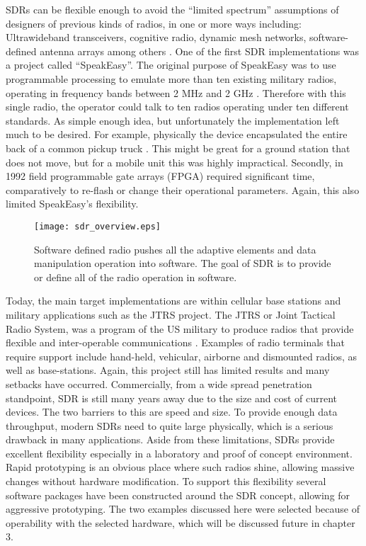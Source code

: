 SDRs can be flexible enough to avoid the ``limited spectrum'' assumptions of designers of previous kinds of radios, in one or more ways including: Ultrawideband transceivers, cognitive radio, dynamic mesh networks, software-defined antenna arrays among others \cite{22}.  One of the first SDR implementations was a project called ``SpeakEasy''.  The original purpose of SpeakEasy was to use programmable processing to emulate more than ten existing military radios, operating in frequency bands between 2 MHz and 2 GHz \cite{23}.  Therefore with this single radio, the operator could talk to ten radios operating under ten different standards.  As simple enough idea, but unfortunately the implementation left much to be desired.  For example, physically the device encapsulated the entire back of a common pickup truck \cite{23}.  This might be great for a ground station that does not move, but for a mobile unit this was highly impractical.  Secondly, in 1992 field programmable gate arrays (FPGA) required significant time, comparatively to re-flash or change their operational parameters.  Again, this also limited SpeakEasy's flexibility.\\

\begin{figure}
\centering
\texttt{[image: sdr\_overview.eps]}
\caption{Software defined radio pushes all the adaptive elements and data manipulation operation into software.  The goal of SDR is to provide or define all of the radio operation in software.}
\label{sdr_overview}
\end{figure}

Today, the main target implementations are within cellular base stations and military applications such as the JTRS project.  The JTRS or Joint Tactical Radio System, was a program of the US military to produce radios that provide flexible and inter-operable communications \cite{24}. Examples of radio terminals that require support include hand-held, vehicular, airborne and dismounted radios, as well as base-stations\cite{24}.  Again, this project still has limited results and many setbacks have occurred.  Commercially, from a wide spread penetration standpoint, SDR is still many years away due to the size and cost of current devices.  The two barriers to this are speed and size.  To provide enough data throughput, modern SDRs need to quite large physically, which is a serious drawback in many applications.   Aside from these limitations, SDRs provide excellent flexibility especially in a laboratory and proof of concept environment.  Rapid prototyping is an obvious place where such radios shine, allowing massive changes without hardware modification.  To support this flexibility several software packages have been constructed around the SDR concept, allowing for aggressive prototyping.  The two examples discussed here were selected because of operability with the selected hardware, which will be discussed future in chapter 3.\\

